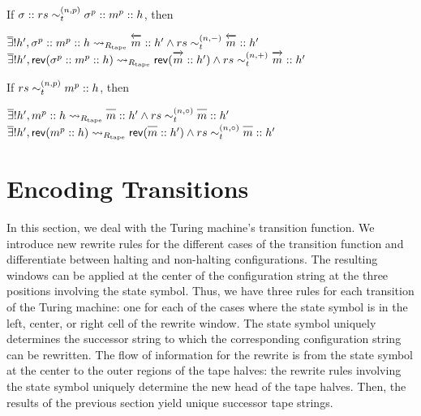 \begin{lemma}\label{lem:tape_rem}
  If $\sigma :: rs \sim_t^{(n, p)} \sigma^p :: m^p :: h$, then 
  \begin{enumerate}
     $\mexists h', \sigma^p :: m^p :: h \strent{\Rtape} \polneg{m} :: h' \land rs \reprtt{n}{-} \polneg{m} :: h'$
     $\mexists h', \rev{(\sigma^p :: m^p :: h)} \strent{\Rtape} \rev{(\polpos{m} :: h')} \land rs \reprtt{n}{+} \polpos{m} :: h'$
  \end{enumerate}
\end{lemma}

\begin{lemma}\label{lem:tape_stay}
  If $rs \sim_t^{(n, p)} m^p :: h$, then 
  \begin{enumerate}
     $\mexists h', m^p :: h \strent{\Rtape} \polneut{m} :: h' \land rs \reprtt{n}{\circ} \polneut{m} :: h'$
     $\mexists h', \rev{(m^p :: h)} \strent{\Rtape} \rev{(\polneut{m} :: h')} \land rs \reprtt{n}{\circ} \polneut{m} :: h'$
  \end{enumerate}
\end{lemma}

\section{Encoding Transitions}
In this section, we deal with the Turing machine's transition function. We introduce new rewrite rules for the different cases of the transition function and differentiate between halting and non-halting configurations.
The resulting windows can be applied at the center of the configuration string at the three positions involving the state symbol. Thus, we have three rules for each transition of the Turing machine: one for each of the cases where the state symbol is in the left, center, or right cell of the rewrite window.
The state symbol uniquely determines the successor string to which the corresponding configuration string can be rewritten. The flow of information for the rewrite is from the state symbol at the center to the outer regions of the tape halves: the rewrite rules involving the state symbol uniquely determine the new head of the tape halves. Then, the results of the previous section yield unique successor tape strings.

